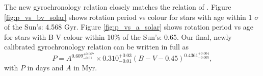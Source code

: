 \documentclass[10pt,preprint]{aastex}
\newcommand{\gyroa}{0.310}
\newcommand{\aerrp}{0.03}
\newcommand{\aerrm}{0.01}
\newcommand{\gyron}{0.609}
\newcommand{\nerrp}{0.007}
\newcommand{\nerrm}{0.01}
\newcommand{\gyrob}{0.4361}
\newcommand{\berrp}{0.004}
\newcommand{\berrm}{0.005}
\begin{document}
The new gyrochronology relation closely matches the relation of \citet{Mamajek2008}.
Figure \ref{fig:p_vs_bv_solar} shows rotation period vs colour for stars with age within 1 $\sigma$ of the Sun's: 4.568 Gyr.
Figure \ref{fig:p_vs_a_solar} shows rotation period vs age for stars with B-V colour within 10\% of the Sun's: 0.65.
Our final, newly calibrated gyrochronology relation can be written in full as
\begin{equation}
	P = A^{\gyron^{+\nerrp}_{-\nerrm}} \times \gyroa^{+\aerrp}_{-\aerrm}(B-V-0.45)^{\gyrob^{+\berrp}_{-\berrm}},
\label{eq:Barnes2007_2}
\end{equation}
with $P$ in days and $A$ in Myr.
\end{document}
